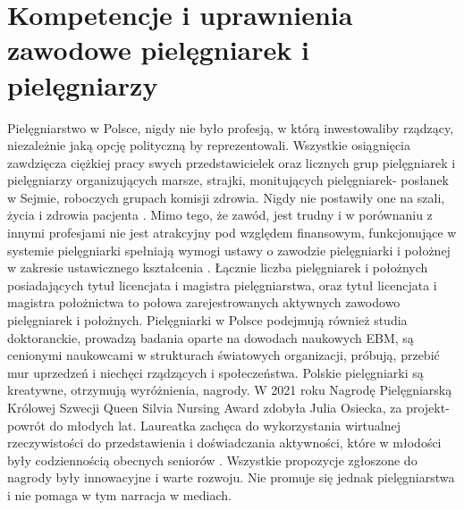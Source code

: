 \documentclass[a4paper,12pt,twoside,openany]{report}
\begin{document}
\section{Kompetencje i uprawnienia zawodowe \newline pielęgniarek i pielęgniarzy}
Pielęgniarstwo w Polsce, nigdy nie było profesją, w którą inwestowaliby rządzący, niezależnie jaką opcję polityczną by reprezentowali. Wszystkie osiągnięcia zawdzięcza ciężkiej pracy swych przedstawicielek oraz licznych grup pielęgniarek i pielęgniarzy organizujących marsze, strajki, monitujących pielęgniarek- posłanek w Sejmie, roboczych grupach komisji zdrowia. Nigdy nie postawiły one na szali, życia i zdrowia pacjenta \cite{strajk}. Mimo tego, że zawód, jest trudny i w porównaniu z innymi profesjami nie jest atrakcyjny pod względem finansowym, funkcjonujące w systemie pielęgniarki spełniają wymogi ustawy o zawodzie pielęgniarki i położnej  w zakresie ustawicznego kształcenia \cite{2011}. Łącznie liczba pielęgniarek i położnych posiadających tytuł licencjata i magistra pielęgniarstwa, oraz tytuł licencjata i magistra położnictwa to połowa zarejestrowanych aktywnych zawodowo pielęgniarek i położnych\cite{ile}. Pielęgniarki w Polsce podejmują również studia doktoranckie, prowadzą badania oparte na dowodach naukowych EBM, są cenionymi naukowcami w strukturach światowych organizacji, próbują, przebić mur uprzedzeń i niechęci rządzących i społeczeństwa. Polskie pielęgniarki są kreatywne, otrzymują wyróżnienia, nagrody. W 2021 roku Nagrodę Pielęgniarską Królowej Szwecji Queen Silvia Nursing Award zdobyła Julia Osiecka, za projekt- powrót do młodych lat. Laureatka zachęca do wykorzystania wirtualnej rzeczywistości do przedstawienia i doświadczania aktywności, które w młodości były codziennością obecnych seniorów \cite{julia}. Wszystkie propozycje zgłoszone do nagrody były innowacyjne i warte rozwoju. Nie promuje się jednak  pielęgniarstwa i nie pomaga w tym narracja w mediach.
\end{document}

